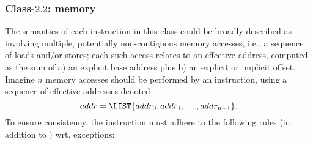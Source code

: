 




\subsubsection{Class-$2.2$: memory}
\label{sec:spec:instruction:2:2}

The semantics of each instruction in this class could be broadly described 
as involving multiple, potentially non-contiguous memory accesses, i.e., a 
sequence of loads and/or stores; each such access relates to an effective
address, computed as the sum of 
a) an explicit             base address 
   plus
b) an explicit or implicit offset.
Imagine $n$ memory accesses should be performed by an instruction, using a 
sequence of effective addresses denoted
\[
addr = \LIST{ addr_0, addr_1, \ldots, addr_{n-1} } .
\]
To ensure consistency, the instruction must adhere to the following rules 
(in addition to ) wrt. exceptions:

